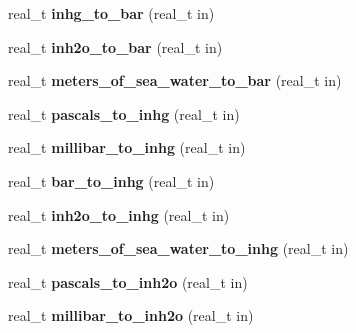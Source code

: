 \begin{DoxyCompactItemize}
\item 
\hypertarget{namespaceetk_a5ad4931c48bddf063df7b1c5369a4146}{real\-\_\-t {\bfseries inhg\-\_\-to\-\_\-bar} (real\-\_\-t in)}\label{namespaceetk_a5ad4931c48bddf063df7b1c5369a4146}

\item 
\hypertarget{namespaceetk_a6b1e6c50f02831bc488ab62187d1272c}{real\-\_\-t {\bfseries inh2o\-\_\-to\-\_\-bar} (real\-\_\-t in)}\label{namespaceetk_a6b1e6c50f02831bc488ab62187d1272c}

\item 
\hypertarget{namespaceetk_af28fb2f510d27226b372fec3dbb7708b}{real\-\_\-t {\bfseries meters\-\_\-of\-\_\-sea\-\_\-water\-\_\-to\-\_\-bar} (real\-\_\-t in)}\label{namespaceetk_af28fb2f510d27226b372fec3dbb7708b}

\item 
\hypertarget{namespaceetk_ad0dabe238faba27b117c5554cd018e28}{real\-\_\-t {\bfseries pascals\-\_\-to\-\_\-inhg} (real\-\_\-t in)}\label{namespaceetk_ad0dabe238faba27b117c5554cd018e28}

\item 
\hypertarget{namespaceetk_a29bec157541c8ab4ce0932150321124e}{real\-\_\-t {\bfseries millibar\-\_\-to\-\_\-inhg} (real\-\_\-t in)}\label{namespaceetk_a29bec157541c8ab4ce0932150321124e}

\item 
\hypertarget{namespaceetk_a1fe6a4e3de597e98832e83e51cbcb21f}{real\-\_\-t {\bfseries bar\-\_\-to\-\_\-inhg} (real\-\_\-t in)}\label{namespaceetk_a1fe6a4e3de597e98832e83e51cbcb21f}

\item 
\hypertarget{namespaceetk_a0f0101ee43949bd76fc837a18c63e01c}{real\-\_\-t {\bfseries inh2o\-\_\-to\-\_\-inhg} (real\-\_\-t in)}\label{namespaceetk_a0f0101ee43949bd76fc837a18c63e01c}

\item 
\hypertarget{namespaceetk_af86b26be978bd668a2fe267a6e3c57fe}{real\-\_\-t {\bfseries meters\-\_\-of\-\_\-sea\-\_\-water\-\_\-to\-\_\-inhg} (real\-\_\-t in)}\label{namespaceetk_af86b26be978bd668a2fe267a6e3c57fe}

\item 
\hypertarget{namespaceetk_ab1bc6015cd35040455ec6ea55c5ffd27}{real\-\_\-t {\bfseries pascals\-\_\-to\-\_\-inh2o} (real\-\_\-t in)}\label{namespaceetk_ab1bc6015cd35040455ec6ea55c5ffd27}

\item 
\hypertarget{namespaceetk_a089db80bdc06d8cbfff7617310badec7}{real\-\_\-t {\bfseries millibar\-\_\-to\-\_\-inh2o} (real\-\_\-t in)}\label{namespaceetk_a089db80bdc06d8cbfff7617310badec7}


\end{DoxyCompactItemize}

